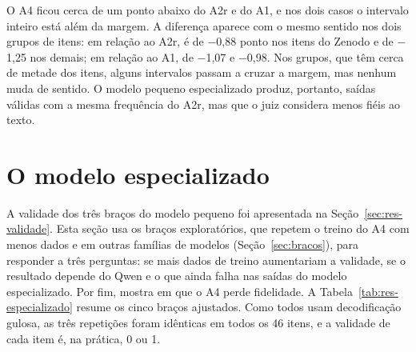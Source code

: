 O A4 ficou cerca de um ponto abaixo do A2r e do A1, e nos dois casos o intervalo inteiro está além da margem. A diferença aparece com o mesmo sentido nos dois grupos de itens: em relação ao A2r, é de $-$0,88 ponto nos itens do Zenodo e de $-$1,25 nos demais; em relação ao A1, de $-$1,07 e $-$0,98. Nos grupos, que têm cerca de metade dos itens, alguns intervalos passam a cruzar a margem, mas nenhum muda de sentido. O modelo pequeno especializado produz, portanto, saídas válidas com a mesma frequência do A2r, mas que o juiz considera menos fiéis ao texto.



\section{O modelo especializado}\label{sec:res-modelo-especializado}

A validade dos três braços do modelo pequeno foi apresentada na Seção~\ref{sec:res-validade}. Esta seção usa os braços exploratórios, que repetem o treino do A4 com menos dados e em outras famílias de modelos (Seção~\ref{sec:bracos}), para responder a três perguntas: se mais dados de treino aumentariam a validade, se o resultado depende do Qwen e o que ainda falha nas saídas do modelo especializado. Por fim, mostra em que o A4 perde fidelidade. A Tabela~\ref{tab:res-especializado} resume os cinco braços ajustados. Como todos usam decodificação gulosa, as três repetições foram idênticas em todos os 46 itens, e a validade de cada item é, na prática, 0 ou 1.

\begin{table}[htb]
\end{table}

